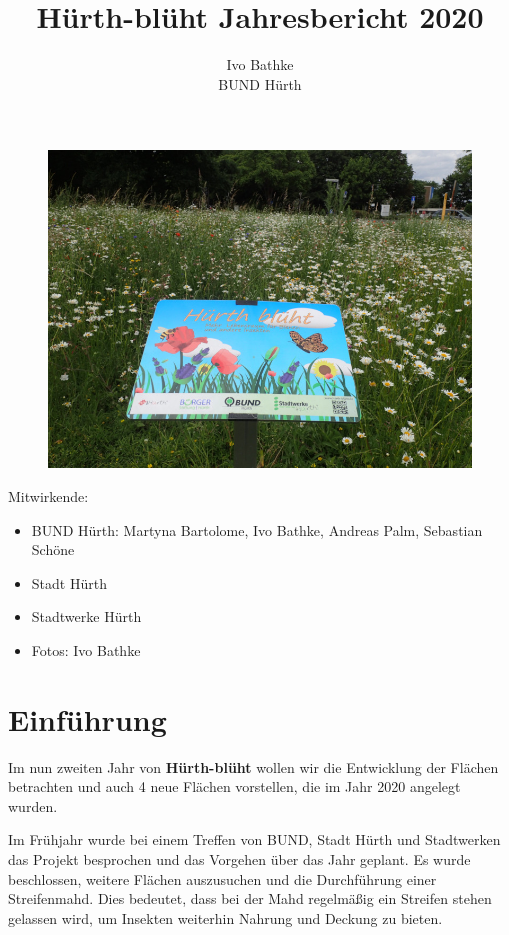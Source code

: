 \documentclass[10pt]{article}
\title{\textbf{Hürth-blüht Jahresbericht 2020}}
\author{Ivo Bathke\\
		BUND Hürth\\}
\date{}
\begin{document}
\maketitle

\begin{figure}[h!]
  \includegraphics[width=\linewidth]{img/titel.jpg}
\end{figure}

Mitwirkende:
\begin{itemize} 
\item BUND Hürth: Martyna Bartolome, Ivo Bathke, Andreas Palm, Sebastian Schöne  
\item Stadt Hürth
\item Stadtwerke Hürth 
\item Fotos: Ivo Bathke
\end{itemize}

\newpage

\section{Einführung}
Im nun zweiten Jahr von \textbf{Hürth-blüht} wollen wir die Entwicklung der Flächen betrachten und auch 4 neue Flächen vorstellen, die im Jahr 2020 angelegt wurden.


Im Frühjahr wurde bei einem Treffen von BUND, Stadt Hürth und Stadtwerken das Projekt besprochen und das Vorgehen über das Jahr geplant. Es wurde beschlossen, weitere Flächen auszusuchen und die Durchführung einer Streifenmahd. Dies bedeutet, dass bei der Mahd regelmäßig ein Streifen stehen gelassen wird, um Insekten weiterhin Nahrung und Deckung zu bieten.
\end{document}
